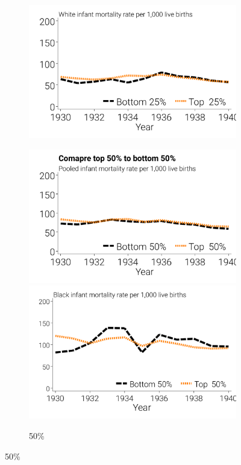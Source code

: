 \documentclass[12pt]{article}
\begin{document}
\begin{landscape}
\begin{figure}[!ht]
\begin{minipage}{\linewidth}
\begin{subfigure}[b]{0.33\columnwidth}
        \includegraphics[width=\linewidth]{../analysis/output/appendix/figure_m1b3_psm_top250pct_fake_treat_clean_cntrls_white_imr_by_treatment_over_time.pdf}
    \end{subfigure}
    \begin{subfigure}[b]{0.33\columnwidth}
        \centering
        \caption{50\%}
        \includegraphics[width=\linewidth]{../analysis/output/appendix/figure_m1c1_psm_top500pct_fake_treat_clean_cntrls_pooled_imr_by_treatment_over_time.pdf}
        \includegraphics[width=\linewidth]{../analysis/output/appendix/figure_m1c2_psm_top500pct_fake_treat_clean_cntrls_black_imr_by_treatment_over_time.pdf}

\end{subfigure}
\end{minipage}
\end{figure}
\end{landscape}
\end{document}
